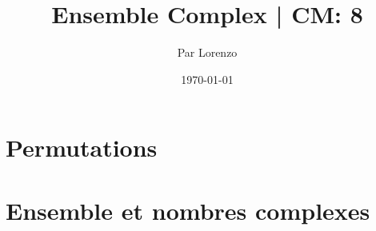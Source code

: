 \documentclass[a4paper, 12pt]{article}
\title{Ensemble Complex | CM: 8}
\author{Par Lorenzo}
\date{\today}
\begin{document}
\maketitle


\section{Permutations}


\section{Ensemble et nombres complexes}

\end{document}
